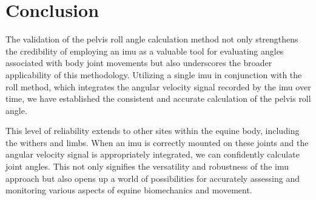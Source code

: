 \section{Conclusion}
\label{sec:conclusion}

The validation of the pelvis roll angle calculation method not only strengthens the credibility of employing an \gls{imu} as a valuable tool for evaluating angles associated with body joint movements but also underscores the broader applicability of this methodology. Utilizing a single \gls{imu} in conjunction with the roll method, which integrates the angular velocity signal recorded by the \gls{imu} over time, we have established the consistent and accurate calculation of the pelvis roll angle.

This level of reliability extends to other sites within the equine body, including the withers and limbs. When an \gls{imu} is correctly mounted on these joints and the angular velocity signal is appropriately integrated, we can confidently calculate joint angles. This not only signifies the versatility and robustness of the \gls{imu} approach but also opens up a world of possibilities for accurately assessing and monitoring various aspects of equine biomechanics and movement.